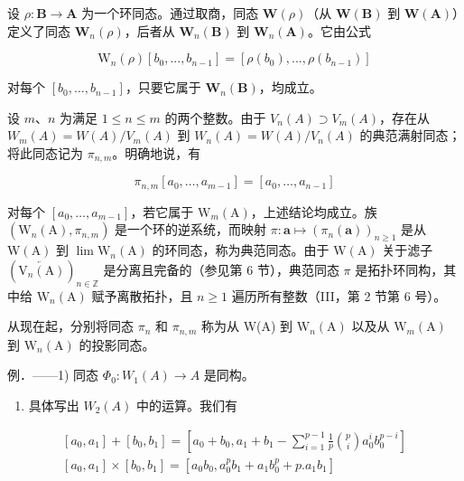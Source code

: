 设 \(\rho : \mathbf{B} \to \mathbf{A}\) 为一个环同态。通过取商，同态 \(\mathbf{W}(\rho)\)（从 \(\mathbf{W}(\mathbf{B})\) 到 \(\mathbf{W}(\mathbf{A})\)）定义了同态 \(\mathbf{W}_n(\rho)\)，后者从 \(\mathbf{W}_n(\mathbf{B})\) 到 \(\mathbf{W}_n(\mathbf{A})\)。它由公式

\[
\mathrm{W} _ {n} (\rho) \left[ b _ {0},..., b _ {n - 1} \right] = \left[ \rho (b _ {0}),..., \rho (b _ {n - 1}) \right]\tag{43}
\]

对每个 \([b_0, \ldots, b_{n-1}]\)，只要它属于 \(\mathbf{W}_n(\mathbf{B})\)，均成立。

设 \(m\)、\(n\) 为满足 \(1 \leqslant n \leqslant m\) 的两个整数。由于 \(V_n(A) \supset V_m(A)\)，存在从 \(W_m(A) = W(A)/V_m(A)\) 到 \(W_n(A) = W(A)/V_n(A)\) 的典范满射同态；将此同态记为 \(\pi_{n,m}\)。明确地说，有

\[
\pi_ {n, m} [ a _ {0}, \dots , a _ {m - 1} ] = [ a _ {0}, \dots , a _ {n - 1} ]\tag{44}
\]

对每个 \([a_0, \ldots, a_{m-1}]\)，若它属于 \(\mathrm{W}_m(\mathrm{A})\)，上述结论均成立。族 \((\mathrm{W}_n(\mathrm{A}), \pi_{n,m})\) 是一个环的逆系统，而映射 \(\pi: \boldsymbol{a} \mapsto (\pi_n(\boldsymbol{a}))_{n \geqslant 1}\) 是从 \(\mathrm{W}(\mathrm{A})\) 到 \(\lim \mathrm{W}_n(\mathrm{A})\) 的环同态，称为典范同态。由于 \(\mathrm{W}(\mathrm{A})\) 关于滤子 \((\overleftarrow{\mathrm{V}_n(\mathrm{A})})_{n \in \mathbb{Z}}\) 是分离且完备的（参见第 6 节），典范同态 \(\pi\) 是拓扑环同构，其中给 \(\mathrm{W}_n(\mathrm{A})\) 赋予离散拓扑，且 \(n \geqslant 1\) 遍历所有整数（III，第 2 节第 6 号）。

从现在起，分别将同态 \(\pi_{n}\) 和 \(\pi_{n,m}\) 称为从 W(A) 到 \(\mathrm{W}_{n}(\mathrm{A})\) 以及从 \(\mathrm{W}_{m}(\mathrm{A})\) 到 \(\mathrm{W}_{n}(\mathrm{A})\) 的投影同态。

例．——1) 同态 \(\Phi_{0}:W_{1}(A)\to A\) 是同构。

\begin{enumerate}
\def\labelenumi{\arabic{enumi})}
\setcounter{enumi}{1}
\tightlist
\item
  具体写出 \(W_{2}(A)\) 中的运算。我们有
\end{enumerate}

\[
\begin{array}{l} \left[ a _ {0}, a _ {1} \right] + \left[ b _ {0}, b _ {1} \right] = \left[ a _ {0} + b _ {0}, a _ {1} + b _ {1} - \sum_ {i = 1} ^ {p - 1} \frac {1}{p} \binom {p} {i} a _ {0} ^ {i} b _ {0} ^ {p - i} \right] \\ \left[ a _ {0}, a _ {1} \right] \times \left[ b _ {0}, b _ {1} \right] = \left[ a _ {0} b _ {0}, a _ {0} ^ {p} b _ {1} + a _ {1} b _ {0} ^ {p} + p. a _ {1} b _ {1} \right] \end{array}
\]

